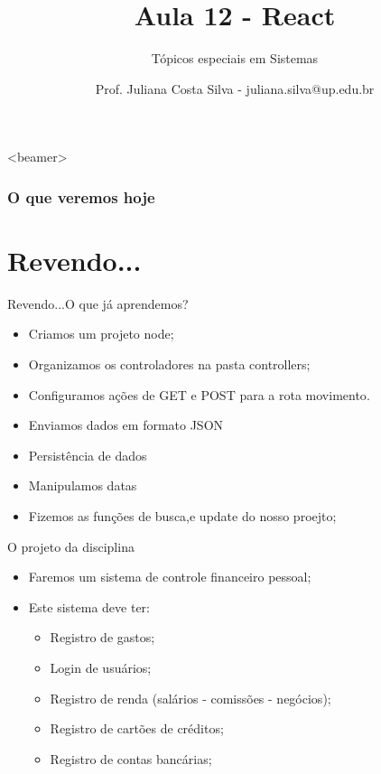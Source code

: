 \documentclass{beamer}
\title{Aula 12  - React}
\subtitle{Tópicos especiais em Sistemas}
\author{Prof. Juliana Costa Silva - juliana.silva@up.edu.br}
\begin{document}
  \frame[c]{\maketitle}
      \begin{frame}<beamer>
      \frametitle{O que veremos hoje}
      \tableofcontents
    \end{frame}
    \section{Revendo...}
    \begin{frame}{Revendo...}{O que já aprendemos?}
      
      \begin{itemize}
            \item Criamos um projeto node;
            \item Organizamos os controladores na pasta controllers;
            \item Configuramos ações de GET e POST para a rota \alert{movimento}.
            \item Enviamos dados em formato JSON
             \item Persistência de dados
             \item Manipulamos datas
             \item Fizemos as funções de busca,e update do nosso proejto;
       \end{itemize}
     \end{frame}
\begin{frame}[label=proof]{O projeto da disciplina}
	\begin{itemize}
	\item Faremos um sistema de controle financeiro pessoal;
	\item Este sistema deve ter:
	\begin{itemize}
	\item Registro de gastos;
	\item Login de usuários;
	\item Registro de renda (salários - comissões - negócios);
	\item Registro de cartões de créditos;
	\item Registro de contas bancárias;
	\end{itemize}
	\end{itemize}
    \end{frame}
\end{document}
